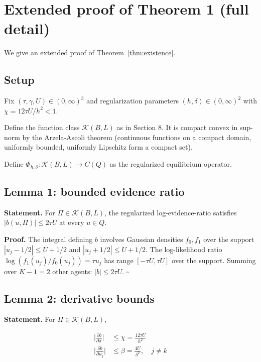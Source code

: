 \documentclass[11pt]{article}
\newcommand{\1}{\mathbf{1}}
\begin{document}
\section{Extended proof of Theorem 1 (full detail)}
\label{app:fullproof}

We give an extended proof of Theorem~\ref{thm:existence}.

\subsection{Setup}

Fix $(\tau, \gamma, U) \in (0, \infty)^3$ and regularization parameters
$(h, \delta) \in (0, \infty)^2$ with $\chi = 12 \tau U / h^2 < 1$.

Define the function class $\mathcal{K}(B, L)$ as in Section 8.  It is
compact convex in sup-norm by the Arzela-Ascoli theorem (continuous
functions on a compact domain, uniformly bounded, uniformly Lipschitz
form a compact set).

Define $\Phi_{h, \delta}: \mathcal{K}(B, L) \to C(Q)$ as the
regularized equilibrium operator.

\subsection{Lemma 1: bounded evidence ratio}

\textbf{Statement.} For $\Pi \in \mathcal{K}(B, L)$, the
regularized log-evidence-ratio satisfies $|b(u, \Pi)| \le 2\tau U$ at
every $u \in Q$.

\textbf{Proof.} The integral defining $b$ involves Gaussian densities
$f_0, f_1$ over the support $|u_j - 1/2| \le U + 1/2$ and $|u_j + 1/2|
\le U + 1/2$.  The log-likelihood ratio $\log(f_1(u_j)/f_0(u_j)) = \tau u_j$
has range $[-\tau U, \tau U]$ over the support.  Summing over $K-1 = 2$
other agents: $|b| \le 2 \tau U$.  $\square$

\subsection{Lemma 2: derivative bounds}

\textbf{Statement.} For $\Pi \in \mathcal{K}(B, L)$,

\begin{align}
\biggl|\frac{\partial b}{\partial \hat\pi}\biggr| &\le \chi = \frac{12 \tau U}{h^2} \\
\biggl|\frac{\partial b}{\partial u_j}\biggr| &\le \beta = \frac{4U}{\delta^2}, \quad j \ne k
\end{align}
\end{document}
